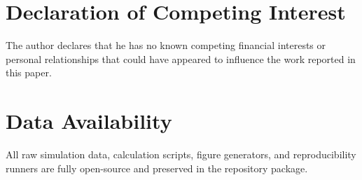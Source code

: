 \documentclass[review,12pt]{article}
\begin{document}
\section*{Declaration of Competing Interest}
The author declares that he has no known competing financial interests or personal relationships that could have appeared to influence the work reported in this paper.

\section*{Data Availability}
All raw simulation data, calculation scripts, figure generators, and reproducibility runners are fully open-source and preserved in the repository package.



\end{document}
